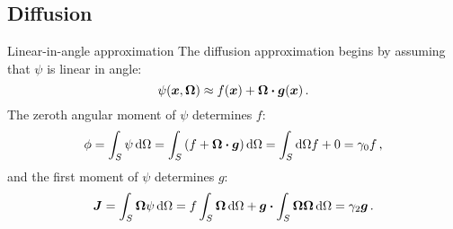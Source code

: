 \documentclass{beamer}
\begin{document}
\subsection{Diffusion}
\begin{frame}{Linear-in-angle approximation}
The diffusion approximation begins by assuming that $\psi$ is linear in angle:
\begin{equation*}
  \psi(\bm{x}, \bm{\Omega}) \approx f(\bm{x}) + \bm{\Omega} \bm{\cdot}
  \bm{g}(\bm{x})\,.
\end{equation*}
The zeroth angular moment of $\psi$ determines $f$:
\begin{equation*}
  \phi = \int_S \psi \mathop{}\!\mathrm{d}\Omega
= \int_S \left( f + \bm{\Omega}\bm{\cdot} \bm{g} \right) \mathop{}\!\mathrm{d}\Omega
= \int_S\mathop{}\!\mathrm{d}\Omega f + 0
= \gamma_0 f \,,
\end{equation*}
and the first moment of $\psi$ determines $g$:
\begin{equation*}
  \bm{J} = \int_S \bm{\Omega} \psi \mathop{}\!\mathrm{d}\Omega
= f \int_S \bm{\Omega} \mathop{}\!\mathrm{d}\Omega
  + \bm{g} \bm{\cdot} \int_S \bm{\Omega}\bm{\Omega} \mathop{}\!\mathrm{d}\Omega
= \gamma_2 \bm{g} \,.
\end{equation*}
%
%
%
\end{frame}
\end{document}
